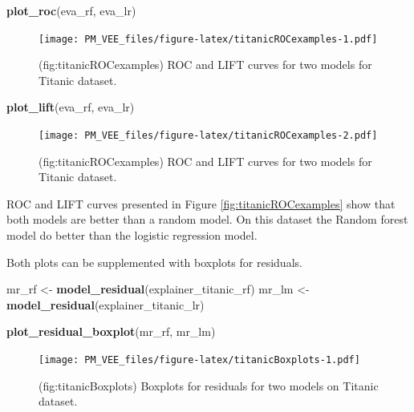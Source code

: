 \documentclass[12pt,]{krantz}
\newenvironment{Shaded}{\begin{snugshade}}{\end{snugshade}}
\newcommand{\KeywordTok}[1]{\textcolor[rgb]{0.13,0.29,0.53}{\textbf{#1}}}
\newcommand{\NormalTok}[1]{#1}
\newcommand{\StringTok}[1]{\textcolor[rgb]{0.31,0.60,0.02}{#1}}
\begin{document}
\begin{Shaded}
\begin{Highlighting}[]
\KeywordTok{plot_roc}\NormalTok{(eva_rf, eva_lr)}
\end{Highlighting}
\end{Shaded}

\begin{figure}
\centering
\texttt{[image: PM\_VEE\_files/figure-latex/titanicROCexamples-1.pdf]}
\caption{\label{fig:titanicROCexamples1}(fig:titanicROCexamples) ROC and LIFT curves for two models for Titanic dataset.}
\end{figure}

\begin{Shaded}
\begin{Highlighting}[]
\KeywordTok{plot_lift}\NormalTok{(eva_rf, eva_lr)}
\end{Highlighting}
\end{Shaded}

\begin{figure}
\centering
\texttt{[image: PM\_VEE\_files/figure-latex/titanicROCexamples-2.pdf]}
\caption{\label{fig:titanicROCexamples2}(fig:titanicROCexamples) ROC and LIFT curves for two models for Titanic dataset.}
\end{figure}

ROC and LIFT curves presented in Figure \ref{fig:titanicROCexamples} show that both models are better than a random model. On this dataset the Random forest model do better than the logistic regression model.

Both plots can be supplemented with boxplots for residuals.

\begin{Shaded}
\begin{Highlighting}[]
\NormalTok{mr_rf <-}\StringTok{ }\KeywordTok{model_residual}\NormalTok{(explainer_titanic_rf)}
\NormalTok{mr_lm <-}\StringTok{ }\KeywordTok{model_residual}\NormalTok{(explainer_titanic_lr)}

\KeywordTok{plot_residual_boxplot}\NormalTok{(mr_rf, mr_lm)}
\end{Highlighting}
\end{Shaded}

\begin{figure}
\centering
\texttt{[image: PM\_VEE\_files/figure-latex/titanicBoxplots-1.pdf]}
\caption{\label{fig:titanicBoxplots}(fig:titanicBoxplots) Boxplots for residuals for two models on Titanic dataset.}
\end{figure}
\end{document}

